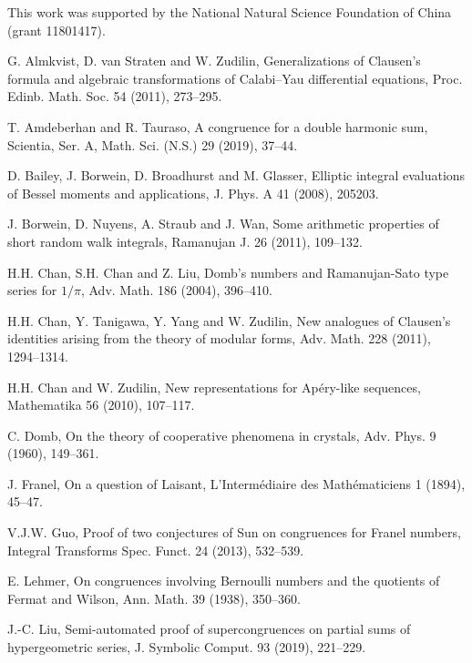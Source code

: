 \documentclass[12pt]{article}
\numberwithin{equation}{section}
\begin{document}
\vskip 5mm 
This work was supported by the National Natural Science Foundation of China (grant 11801417).

\begin{thebibliography}{99}

\small \setlength{\itemsep}{-.8mm}

G. Almkvist, D. van Straten and W. Zudilin, Generalizations of Clausen's formula and algebraic transformations of Calabi--Yau differential equations, Proc. Edinb. Math. Soc. 54 (2011), 273--295.

T. Amdeberhan and R. Tauraso, A congruence for a double harmonic sum,
Scientia, Ser. A, Math. Sci. (N.S.) 29 (2019), 37--44.

D. Bailey, J. Borwein, D. Broadhurst and M. Glasser, Elliptic integral evaluations of Bessel moments and applications, J. Phys. A 41 (2008), 205203.

J. Borwein, D. Nuyens, A. Straub and J. Wan, Some arithmetic properties of short random walk integrals, Ramanujan J. 26 (2011), 109--132.

H.H. Chan, S.H. Chan and Z. Liu, Domb's numbers and Ramanujan-Sato type series for $1/\pi$, Adv. Math. 186 (2004), 396--410.

H.H. Chan, Y. Tanigawa, Y. Yang and W. Zudilin, New analogues of Clausen's identities arising from the theory of modular forms, Adv. Math. 228 (2011), 1294--1314.

H.H. Chan and W. Zudilin, New representations for Ap\'ery-like sequences,
Mathematika 56 (2010), 107--117.

C. Domb, On the theory of cooperative phenomena in crystals, Adv. Phys. 9 (1960), 149--361.

J. Franel, On a question of Laisant, L'Interm\'ediaire des Math\'ematiciens 1 (1894), 45--47.

V.J.W. Guo, Proof of two conjectures of Sun on congruences for Franel numbers, Integral Transforms Spec. Funct. 24 (2013), 532--539.

E. Lehmer, On congruences involving Bernoulli numbers and the quotients of Fermat and Wilson, Ann. Math. 39 (1938), 350--360.

J.-C. Liu, Semi-automated proof of supercongruences on partial sums of hypergeometric series, J. Symbolic Comput. 93 (2019), 221--229.


\end{thebibliography}
\end{document}
